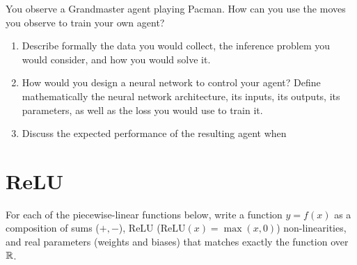 \documentclass[11pt, a4paper]{article}
\begin{document}
You observe a Grandmaster agent playing Pacman. How can you use the moves you observe to train your own agent?

\begin{enumerate}
    \item Describe formally the data you would collect, the inference problem you would consider, and how you would solve it.

    \item How would you design a neural network to control your agent? Define mathematically the neural network architecture, its inputs, its outputs, its parameters, as well as the loss you would use to train it.

    \item Discuss the expected performance of the resulting agent when 
\end{enumerate}

\newpage

\section{ReLU}

For each of the piecewise-linear functions below, write a function $y = f(x)$ as a composition of sums ($+, -$), ReLU ($\mathrm{ReLU}(x) = \max(x, 0)$) non-linearities, and real parameters (weights and biases) that matches exactly the function over $\mathbb{R}$.

\begin{center}
\end{center}
\end{document}
